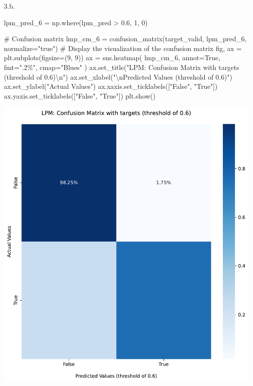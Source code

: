 \documentclass[
  11pt,
  letterpaper,
  DIV=11,
  numbers=noendperiod]{scrartcl}
\newenvironment{Shaded}{\begin{snugshade}}{\end{snugshade}}
\newcommand{\CharTok}[1]{\textcolor[rgb]{0.13,0.47,0.30}{#1}}
\newcommand{\CommentTok}[1]{\textcolor[rgb]{0.37,0.37,0.37}{#1}}
\newcommand{\DecValTok}[1]{\textcolor[rgb]{0.68,0.00,0.00}{#1}}
\newcommand{\FloatTok}[1]{\textcolor[rgb]{0.68,0.00,0.00}{#1}}
\newcommand{\NormalTok}[1]{\textcolor[rgb]{0.00,0.23,0.31}{#1}}
\newcommand{\OperatorTok}[1]{\textcolor[rgb]{0.37,0.37,0.37}{#1}}
\newcommand{\StringTok}[1]{\textcolor[rgb]{0.13,0.47,0.30}{#1}}
\newcommand{\VariableTok}[1]{\textcolor[rgb]{0.07,0.07,0.07}{#1}}
\begin{document}
3.b.

\begin{Shaded}
\begin{Highlighting}[]
\NormalTok{lpm\_pred\_6 }\OperatorTok{=}\NormalTok{ np.where(lpm\_pred }\OperatorTok{\textgreater{}} \FloatTok{0.6}\NormalTok{, }\DecValTok{1}\NormalTok{, }\DecValTok{0}\NormalTok{)}

\CommentTok{\# Confusion matrix}
\NormalTok{lmp\_cm\_6 }\OperatorTok{=}\NormalTok{ confusion\_matrix(target\_valid, lpm\_pred\_6, normalize}\OperatorTok{=}\StringTok{"true"}\NormalTok{)}
\CommentTok{\# Display the visualization of the confusion matrix}
\NormalTok{fig, ax }\OperatorTok{=}\NormalTok{ plt.subplots(figsize}\OperatorTok{=}\NormalTok{(}\DecValTok{9}\NormalTok{, }\DecValTok{9}\NormalTok{))}
\NormalTok{ax }\OperatorTok{=}\NormalTok{ sns.heatmap(}
\NormalTok{lmp\_cm\_6, annot}\OperatorTok{=}\VariableTok{True}\NormalTok{, fmt}\OperatorTok{=}\StringTok{".2\%"}\NormalTok{, cmap}\OperatorTok{=}\StringTok{"Blues"}
\NormalTok{)}
\NormalTok{ax.set\_title(}\StringTok{"LPM: Confusion Matrix with targets (threshold of 0.6)}\CharTok{\textbackslash{}n}\StringTok{"}\NormalTok{)}
\NormalTok{ax.set\_xlabel(}\StringTok{"}\CharTok{\textbackslash{}n}\StringTok{Predicted Values (threshold of 0.6)"}\NormalTok{)}
\NormalTok{ax.set\_ylabel(}\StringTok{"Actual Values"}\NormalTok{)}
\NormalTok{ax.xaxis.set\_ticklabels([}\StringTok{"False"}\NormalTok{, }\StringTok{"True"}\NormalTok{])}
\NormalTok{ax.yaxis.set\_ticklabels([}\StringTok{"False"}\NormalTok{, }\StringTok{"True"}\NormalTok{])}
\NormalTok{plt.show()}
\end{Highlighting}
\end{Shaded}

\includegraphics{mp2_files/figure-pdf/cell-8-output-1.pdf}
\end{document}
